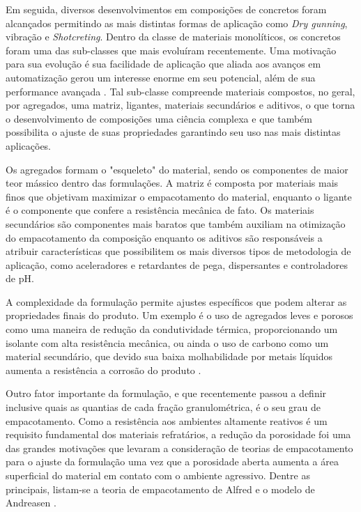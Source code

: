 Em seguida, diversos desenvolvimentos em composições de concretos foram
alcançados permitindo as mais distintas formas de aplicação como \textit{Dry
  gunning}, vibração e \textit{Shotcreting}. Dentro da classe de materiais
monolíticos, os concretos foram uma das sub-classes que mais evoluíram
recentemente. Uma motivação para sua evolução é sua facilidade de aplicação que
aliada aos avanços em automatização gerou um interesse enorme em seu potencial,
além de sua performance avançada \cite{Schacht2004}. Tal sub-classe compreende
materiais compostos, no geral, por agregados, uma matriz, ligantes, materiais
secundários e aditivos, o que torna o desenvolvimento de composições uma ciência
complexa e que também possibilita o ajuste de suas propriedades garantindo seu
uso nas mais distintas aplicações.
    
Os agregados formam o "esqueleto" do material, sendo os componentes de maior
teor mássico dentro das formulações. A matriz é composta por materiais mais
finos que objetivam maximizar o empacotamento do material, enquanto o ligante é
o componente que confere a resistência mecânica de fato. Os materiais
secundários são componentes mais baratos que também auxiliam na otimização do
empacotamento da composição enquanto os aditivos são responsáveis a atribuir
características que possibilitem os mais diversos tipos de metodologia de
aplicação, como aceleradores e retardantes de pega, dispersantes e controladores
de pH.
    
A complexidade da formulação permite ajustes específicos que podem alterar as
propriedades finais do produto. Um exemplo é o uso de agregados leves e porosos
como uma maneira de redução da condutividade térmica, proporcionando um isolante
com alta resistência mecânica, ou ainda o uso de carbono como um material
secundário, que devido sua baixa molhabilidade por metais líquidos aumenta a
resistência a corrosão do produto \cite{Schacht2004}.
    
Outro fator importante da formulação, e que recentemente passou a definir
inclusive quais as quantias de cada fração granulométrica, é o seu grau de
empacotamento. Como a resistência aos ambientes altamente reativos é um
requisito fundamental dos materiais refratários, a redução da porosidade foi uma
das grandes motivações que levaram a consideração de teorias de empacotamento
para o ajuste da formulação uma vez que a porosidade aberta aumenta a área
superficial do material em contato com o ambiente agressivo. Dentre as
principais, listam-se a teoria de empacotamento de Alfred e o modelo de
Andreasen \cite{Ortega1997}.
    
